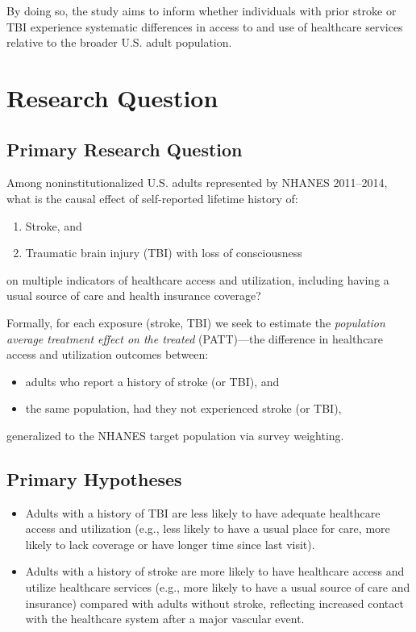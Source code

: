 \documentclass{article}
\begin{document}
By doing so, the study aims to inform whether individuals with prior stroke or TBI experience systematic differences in access to and use of healthcare services relative to the broader U.S. adult population.

\section{Research Question}

\subsection{Primary Research Question}

Among noninstitutionalized U.S. adults represented by NHANES 2011--2014, what is the causal effect of self-reported lifetime history of:

\begin{enumerate}
    \item Stroke, and

    \item Traumatic brain injury (TBI) with loss of consciousness

\end{enumerate}

on multiple indicators of healthcare access and utilization, including having a usual source of care and health insurance coverage?

Formally, for each exposure (stroke, TBI) we seek to estimate the \emph{population average treatment effect on the treated} (PATT)---the difference in healthcare access and utilization outcomes between:

\begin{itemize}
    \item adults who report a history of stroke (or TBI), and

    \item the same population, had they not experienced stroke (or TBI),

\end{itemize}

generalized to the NHANES target population via survey weighting.

\subsection{Primary Hypotheses}

\begin{itemize}
    \item Adults with a history of TBI are less likely to have adequate healthcare access and utilization (e.g., less likely to have a usual place for care, more likely to lack coverage or have longer time since last visit).

    \item Adults with a history of stroke are more likely to have healthcare access and utilize healthcare services (e.g., more likely to have a usual source of care and insurance) compared with adults without stroke, reflecting increased contact with the healthcare system after a major vascular event.

\end{itemize}
\end{document}
